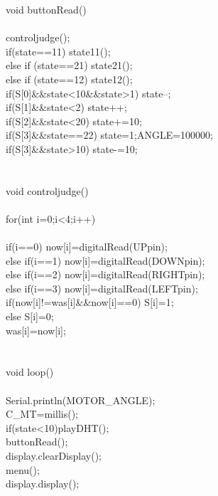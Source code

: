 void buttonRead()\\
{\\
	controljudge();\\
	if(state==11) state11(); \\
	else if (state==21) state21();\\
	else if (state==12) state12();\\
	if(S[0]\&\&state<10\&\&state>1) state--;\\
	if(S[1]\&\&state<2) state++;\\
	if(S[2]\&\&state<20) state+=10;\\
	if(S[3]\&\&state==22) {state=1;ANGLE=100000;}\\
	if(S[3]\&\&state>10) state-=10;\\
	\\
}\\
void controljudge()\\
{\\
	for(int i=0;i<4;i++)\\
	{\\
		if(i==0) now[i]=digitalRead(UPpin);\\
		else if(i==1) now[i]=digitalRead(DOWNpin);\\
		else if(i==2) now[i]=digitalRead(RIGHTpin);\\
		else if(i==3) now[i]=digitalRead(LEFTpin);\\
		if(now[i]!=was[i]\&\&now[i]==0) S[i]=1;\\
		else S[i]=0;\\
		was[i]=now[i];\\
	}\\
}\\
void loop()\\
{\\
	Serial.println(MOTOR\_ANGLE);\\
	C\_MT=millis();\\
	if(state<10)playDHT();\\
	buttonRead();\\
	display.clearDisplay();\\
	menu();\\
	display.display();\\
}\\
